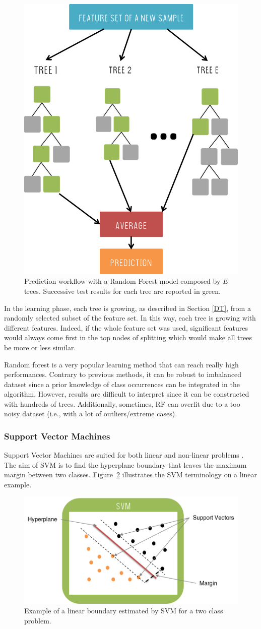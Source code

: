 \documentclass[a4paper,10pt]{article}
\begin{document}
\begin{figure}[htbp]
\centerline{\includegraphics[width=0.4\linewidth]{./figures/RF.png}}
\caption{Prediction workflow with a Random Forest model composed by $E$ trees. Successive test results for each tree are reported in green.}
\label{RFEx}
\end{figure}
 
In the learning phase, each tree is growing, as described in Section \ref{DT}, from a randomly selected subset of the feature set. In this way, each tree is growing with different features. Indeed, if the whole feature set was used, significant features would always come first in the top nodes of splitting which would make all trees be more or less similar.

Random forest is a very popular learning method that can reach really high performances. Contrary to previous methods, it can be robust to imbalanced dataset since a prior knowledge of class occurrences can be integrated in the algorithm. However, results are difficult to interpret since it can be constructed with hundreds of trees. Additionally, sometimes, RF can overfit due to a too noisy dataset (i.e., with a lot of outliers/extreme cases).

\subsubsection{Support Vector Machines}

Support Vector Machines are suited for both linear and non-linear problems \cite{cortes1995support}. The aim of SVM is to find the hyperplane boundary that leaves the maximum margin between two classes. Figure~\ref{SVMEx} illustrates the SVM terminology on a linear example.

\begin{figure}[htbp]
\centerline{\includegraphics[width=0.6\linewidth]{./figures/SVM.png}}
\caption{Example of a linear boundary estimated by SVM for a two class problem.}
\label{SVMEx}
\end{figure}
\end{document}
